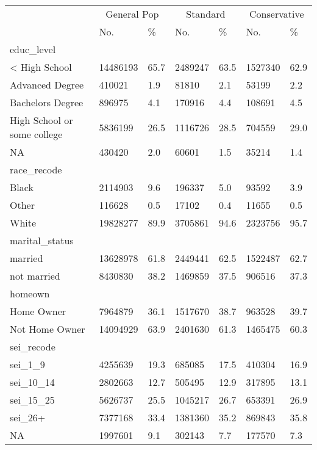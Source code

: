 \captionsetup[table]{labelformat=empty,skip=1pt}
\begin{longtable}{lllllll}
\toprule
& \multicolumn{2}{c}{General Pop} & \multicolumn{2}{c}{Standard} & \multicolumn{2}{c}{Conservative} \\ 
 \cmidrule(lr){2-3}\cmidrule(lr){4-5}\cmidrule(lr){6-7}
 & No. & \% & No. & \% & No. & \% \\ 
\midrule
\multicolumn{1}{l}{educ\_level} \\ 
\midrule
< High School & 14486193 & 65.7 & 2489247 & 63.5 & 1527340 & 62.9 \\ 
Advanced Degree & 410021 & 1.9 & 81810 & 2.1 & 53199 & 2.2 \\ 
Bachelors Degree & 896975 & 4.1 & 170916 & 4.4 & 108691 & 4.5 \\ 
High School or some college & 5836199 & 26.5 & 1116726 & 28.5 & 704559 & 29.0 \\ 
NA & 430420 & 2.0 & 60601 & 1.5 & 35214 & 1.4 \\ 
\midrule
\multicolumn{1}{l}{race\_recode} \\ 
\midrule
Black & 2114903 & 9.6 & 196337 & 5.0 & 93592 & 3.9 \\ 
Other & 116628 & 0.5 & 17102 & 0.4 & 11655 & 0.5 \\ 
White & 19828277 & 89.9 & 3705861 & 94.6 & 2323756 & 95.7 \\ 
\midrule
\multicolumn{1}{l}{marital\_status} \\ 
\midrule
married & 13628978 & 61.8 & 2449441 & 62.5 & 1522487 & 62.7 \\ 
not married & 8430830 & 38.2 & 1469859 & 37.5 & 906516 & 37.3 \\ 
\midrule
\multicolumn{1}{l}{homeown} \\ 
\midrule
Home Owner & 7964879 & 36.1 & 1517670 & 38.7 & 963528 & 39.7 \\ 
Not Home Owner & 14094929 & 63.9 & 2401630 & 61.3 & 1465475 & 60.3 \\ 
\midrule
\multicolumn{1}{l}{sei\_recode} \\ 
\midrule
sei\_1\_9 & 4255639 & 19.3 & 685085 & 17.5 & 410304 & 16.9 \\ 
sei\_10\_14 & 2802663 & 12.7 & 505495 & 12.9 & 317895 & 13.1 \\ 
sei\_15\_25 & 5626737 & 25.5 & 1045217 & 26.7 & 653391 & 26.9 \\ 
sei\_26+ & 7377168 & 33.4 & 1381360 & 35.2 & 869843 & 35.8 \\ 
NA & 1997601 & 9.1 & 302143 & 7.7 & 177570 & 7.3 \\ 

\end{longtable}

